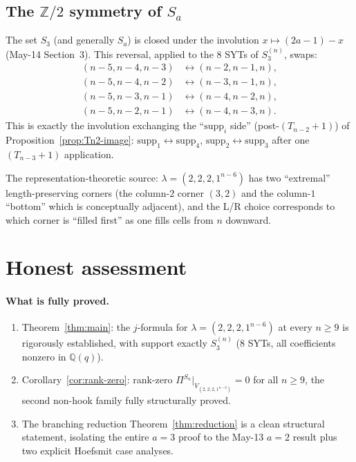 \documentclass[11pt]{article}
\theoremstyle{definition}
\begin{document}
\subsection{The $\mathbb{Z}/2$ symmetry of $S_a$}

The set $S_3$ (and generally $S_a$) is closed under the involution
$x\mapsto(2a-1)-x$ (May-14 Section~3).  This reversal, applied
to the $8$ SYTs of $S_3^{(n)}$, swaps:
\begin{align*}
   (n{-}5,n{-}4,n{-}3)&\leftrightarrow(n{-}2,n{-}1,n),\\
   (n{-}5,n{-}4,n{-}2)&\leftrightarrow(n{-}3,n{-}1,n),\\
   (n{-}5,n{-}3,n{-}1)&\leftrightarrow(n{-}4,n{-}2,n),\\
   (n{-}5,n{-}2,n{-}1)&\leftrightarrow(n{-}4,n{-}3,n).
\end{align*}
This is exactly the involution exchanging the ``$\mathrm{supp}_i$
side'' (post-$(T_{n-2}{+}1)$) of Proposition~\ref{prop:Tn2-image}:
$\mathrm{supp}_1\leftrightarrow\mathrm{supp}_4$,
$\mathrm{supp}_2\leftrightarrow\mathrm{supp}_3$ after one
$(T_{n-3}{+}1)$ application.

The representation-theoretic source: $\lambda=(2,2,2,1^{n-6})$ has
two ``extremal'' length-preserving corners (the column-$2$ corner
$(3,2)$ and the column-$1$ ``bottom'' which is conceptually
adjacent), and the L/R choice corresponds to which corner is
``filled first'' as one fills cells from $n$ downward.

\section{Honest assessment}

\paragraph{What is fully proved.}
\begin{enumerate}[leftmargin=2em,topsep=0.3em,itemsep=0.2em]
\item Theorem~\ref{thm:main}: the $j$-formula for
$\lambda=(2,2,2,1^{n-6})$ at every $n\ge 9$ is rigorously
established, with support exactly $S_3^{(n)}$ ($8$ SYTs, all
coefficients nonzero in $\mathbb{Q}(q)$).
\item Corollary~\ref{cor:rank-zero}: rank-zero
$\Pi^{S_n}|_{V_{(2,2,2,1^{n-6})}}=0$ for all $n\ge 9$, the second
non-hook family fully structurally proved.
\item The branching reduction Theorem~\ref{thm:reduction} is a
clean structural statement, isolating the entire $a=3$ proof to
the May-13 $a=2$ result plus two explicit Hoefsmit case analyses.
\end{enumerate}
\end{document}
